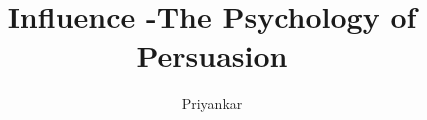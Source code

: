 \documentclass{notestyle}
\title{Influence -The Psychology of Persuasion}
\author{Priyankar}
\begin{document}
\maketitle
\tableofcontents
\clearpage















\nocite{*}
\end{document}
